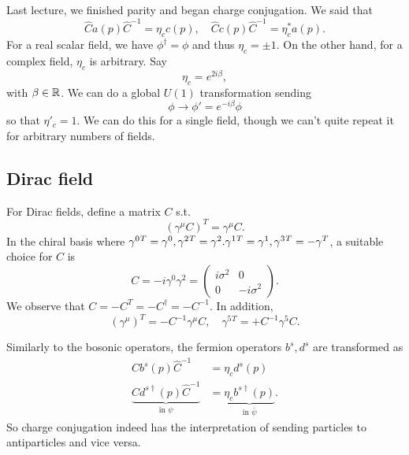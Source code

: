 Last lecture, we finished parity and began charge conjugation. We said that
\begin{equation*}
    \hat C a(p) \hat C^{-1} = \eta_c c(p), \quad \hat C c(p) \hat C^{-1} = \eta_c^* a(p).
\end{equation*}
For a real scalar field, we have $\phi^\dagger = \phi$ and thus $\eta_c=\pm 1$. On the other hand, for a complex field, $\eta_c$ is arbitrary. Say
\begin{equation}
    \eta_c=e^{2i\beta},
\end{equation}
with $\beta\in \mathbb{R}$. We can do a global $U(1)$ transformation sending
\begin{equation*}
    \phi \to \phi' = e^{-i\beta} \phi
\end{equation*}
so that $\eta'_c= 1$. We can do this for a single field, though we can't quite repeat it for arbitrary numbers of fields.

\subsection*{Dirac field}
For Dirac fields, define a matrix $C$ s.t. 
\begin{equation}
    (\gamma^\mu C)^T = \gamma^\mu C.
\end{equation}
In the chiral basis where $\gamma^0{}^T= \gamma^0, \gamma^2{}^T = \gamma^2. \gamma^1{}^T=\-\gamma^1, \gamma^3{}^T=-\gamma^T$, a suitable choice for $C$ is
\begin{equation}
    C=-i\gamma^0 \gamma^2 =\begin{pmatrix}
        i\sigma^2 & 0\\
        0 & -i\sigma^2
    \end{pmatrix}.
\end{equation}
We observe that $C=-C^T = -C^\dagger =-C^{-1}.$ In addition,
\begin{equation}
    (\gamma^\mu)^T= -C^{-1} \gamma^\mu C, \quad \gamma^5{}^T = +C^{-1} \gamma^5 C.
\end{equation}

Similarly to the bosonic operators, the fermion operators $b^s, d^s$ are transformed as
\begin{align*}
    \hat C b^s(p) \hat C^{-1}&= \eta_c d^s(p)\\
    \underbrace{\hat C d^{s\dagger}(p) \hat C^{-1}}_{\text{in }\psi} &= \underbrace{\eta_c b^{s\dagger}(p)}_{\text{in }\bar\psi}.
\end{align*}
So charge conjugation indeed has the interpretation of sending particles to antiparticles and vice versa.

